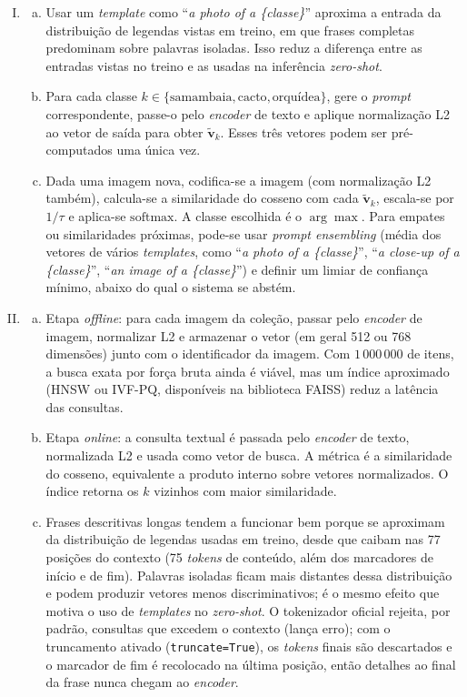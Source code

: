 \documentclass{dlproblemset}
\begin{document}
\begin{enumerate}[I)]
    \item
    \begin{enumerate}[(a)]
        \item Usar um \textit{template} como ``\textit{a photo of a \{classe\}}'' aproxima a entrada da distribuição de legendas vistas em treino, em que frases completas predominam sobre palavras isoladas. Isso reduz a diferença entre as entradas vistas no treino e as usadas na inferência \textit{zero-shot}.
        \item Para cada classe $k \in \{\text{samambaia}, \text{cacto}, \text{orquídea}\}$, gere o \textit{prompt} correspondente, passe-o pelo \textit{encoder} de texto e aplique normalização L2 ao vetor de saída para obter $\tilde{\mathbf{v}}_k$. Esses três vetores podem ser pré-computados uma única vez.
        \item Dada uma imagem nova, codifica-se a imagem (com normalização L2 também), calcula-se a similaridade do cosseno com cada $\tilde{\mathbf{v}}_k$, escala-se por $1/\tau$ e aplica-se $\mathrm{softmax}$. A classe escolhida é o $\arg\max$. Para empates ou similaridades próximas, pode-se usar \textit{prompt ensembling} (média dos vetores de vários \textit{templates}, como ``\textit{a photo of a \{classe\}}'', ``\textit{a close-up of a \{classe\}}'', ``\textit{an image of a \{classe\}}'') e definir um limiar de confiança mínimo, abaixo do qual o sistema se abstém.
    \end{enumerate}

    \item
    \begin{enumerate}[(a)]
        \item Etapa \textit{offline}: para cada imagem da coleção, passar pelo \textit{encoder} de imagem, normalizar L2 e armazenar o vetor (em geral 512 ou 768 dimensões) junto com o identificador da imagem. Com $1\,000\,000$ de itens, a busca exata por força bruta ainda é viável, mas um índice aproximado (HNSW ou IVF-PQ, disponíveis na biblioteca FAISS) reduz a latência das consultas.
        \item Etapa \textit{online}: a consulta textual é passada pelo \textit{encoder} de texto, normalizada L2 e usada como vetor de busca. A métrica é a similaridade do cosseno, equivalente a produto interno sobre vetores normalizados. O índice retorna os $k$ vizinhos com maior similaridade.
        \item Frases descritivas longas tendem a funcionar bem porque se aproximam da distribuição de legendas usadas em treino, desde que caibam nas 77 posições do contexto (75 \textit{tokens} de conteúdo, além dos marcadores de início e de fim). Palavras isoladas ficam mais distantes dessa distribuição e podem produzir vetores menos discriminativos; é o mesmo efeito que motiva o uso de \textit{templates} no \textit{zero-shot}. O tokenizador oficial rejeita, por padrão, consultas que excedem o contexto (lança erro); com o truncamento ativado (\texttt{truncate=True}), os \textit{tokens} finais são descartados e o marcador de fim é recolocado na última posição, então detalhes ao final da frase nunca chegam ao \textit{encoder}.
    \end{enumerate}


\end{enumerate}
\end{document}
